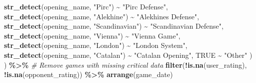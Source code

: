 \documentclass[
]{article}
\newenvironment{Shaded}{\begin{snugshade}}{\end{snugshade}}
\newcommand{\CommentTok}[1]{\textcolor[rgb]{0.56,0.35,0.01}{\textit{#1}}}
\newcommand{\ConstantTok}[1]{\textcolor[rgb]{0.56,0.35,0.01}{#1}}
\newcommand{\FunctionTok}[1]{\textcolor[rgb]{0.13,0.29,0.53}{\textbf{#1}}}
\newcommand{\NormalTok}[1]{#1}
\newcommand{\SpecialCharTok}[1]{\textcolor[rgb]{0.81,0.36,0.00}{\textbf{#1}}}
\newcommand{\StringTok}[1]{\textcolor[rgb]{0.31,0.60,0.02}{#1}}
\begin{document}
\begin{Shaded}
\begin{Highlighting}[]
        \FunctionTok{str\_detect}\NormalTok{(opening\_name, }\StringTok{"Pirc"}\NormalTok{) }\SpecialCharTok{\textasciitilde{}} \StringTok{"Pirc Defense"}\NormalTok{,}
        \FunctionTok{str\_detect}\NormalTok{(opening\_name, }\StringTok{"Alekhine"}\NormalTok{) }\SpecialCharTok{\textasciitilde{}} \StringTok{"Alekhine\textquotesingle{}s Defense"}\NormalTok{,}
        \FunctionTok{str\_detect}\NormalTok{(opening\_name, }\StringTok{"Scandinavian"}\NormalTok{) }\SpecialCharTok{\textasciitilde{}} \StringTok{"Scandinavian Defense"}\NormalTok{,}
        \FunctionTok{str\_detect}\NormalTok{(opening\_name, }\StringTok{"Vienna"}\NormalTok{) }\SpecialCharTok{\textasciitilde{}} \StringTok{"Vienna Game"}\NormalTok{,}
        \FunctionTok{str\_detect}\NormalTok{(opening\_name, }\StringTok{"London"}\NormalTok{) }\SpecialCharTok{\textasciitilde{}} \StringTok{"London System"}\NormalTok{,}
        \FunctionTok{str\_detect}\NormalTok{(opening\_name, }\StringTok{"Catalan"}\NormalTok{) }\SpecialCharTok{\textasciitilde{}} \StringTok{"Catalan Opening"}\NormalTok{,}
        \ConstantTok{TRUE} \SpecialCharTok{\textasciitilde{}} \StringTok{"Other"}
\NormalTok{      )}
\NormalTok{    ) }\SpecialCharTok{\%\textgreater{}\%}
    \CommentTok{\# Remove games with missing critical data}
    \FunctionTok{filter}\NormalTok{(}\SpecialCharTok{!}\FunctionTok{is.na}\NormalTok{(user\_rating), }\SpecialCharTok{!}\FunctionTok{is.na}\NormalTok{(opponent\_rating)) }\SpecialCharTok{\%\textgreater{}\%}
    \FunctionTok{arrange}\NormalTok{(game\_date)}


\end{Highlighting}
\end{Shaded}
\end{document}
